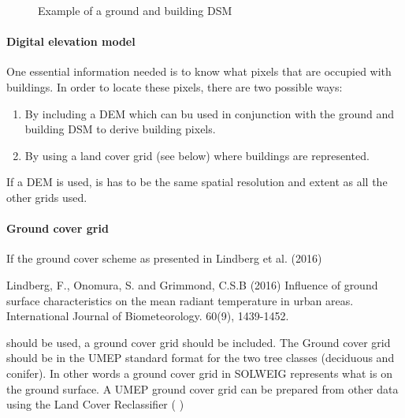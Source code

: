\documentclass[letterpaper,10pt,english]{sphinxmanual}
\begin{document}
\begin{figure}[htbp]
\centering
\capstart

\noindent{}
\caption{Example of a ground and building DSM}\label{\detokenize{OtherManuals/SOLWEIG:id21}}\end{figure}


\paragraph{Digital elevation model}
\label{\detokenize{OtherManuals/SOLWEIG:digital-elevation-model}}
One essential information needed is to know what pixels that are
occupied with buildings. In order to locate these pixels, there are two
possible ways:
\begin{enumerate}
\item {} 
By including a DEM which can bu used in conjunction with the ground
and building DSM to derive building pixels.

\item {} 
By using a land cover grid (see below) where buildings are
represented.

\end{enumerate}

If a DEM is used, is has to be the same spatial resolution and extent as
all the other grids used.


\paragraph{Ground cover grid}
\label{\detokenize{OtherManuals/SOLWEIG:ground-cover-grid}}
If the ground cover scheme as presented in Lindberg et al. (2016)  %
\begin{footnote}[3]\sphinxAtStartFootnote
Lindberg, F., Onomura, S. and Grimmond, C.S.B (2016) Influence of
ground surface characteristics on the mean radiant temperature in
urban areas. International Journal of Biometeorology. 60(9),
1439-1452.
%
\end{footnote}
should be used, a ground cover grid should be included. The Ground cover
grid should be in the UMEP standard format  for the two tree
classes (deciduous and conifer). In other words a ground cover grid in
SOLWEIG represents what is on the ground surface. A UMEP ground cover
grid can be prepared from other data using the Land Cover Reclassifier
( {\hyperref[\detokenize{pre-processor/Urban Land Cover Land Cover Reclassifier:landcoverreclassifier}]{}})
\end{document}
